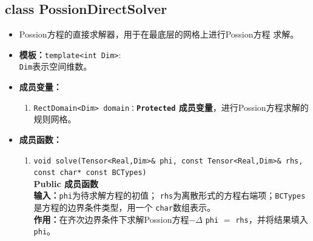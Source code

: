 \documentclass[a4paper,twoside]{ctexart}
\begin{document}
 \subsection*{class PossionDirectSolver}
\begin{itemize}
    \item Possion方程的直接求解器，用于在最底层的网格上进行Possion方程
      求解。
    \item \textbf{模板：}\texttt{template<int Dim>}:\\
    \texttt{Dim}表示空间维数。
     \item \textbf{成员变量：}
        \begin{enumerate}[(1)]
            \item \texttt{RectDomain<Dim>
                domain：}\textbf{\texttt{Protected}  成员变量}，进行Possion方程求解的规则网格。
        \end{enumerate}
    \item \textbf{成员函数：}
        \begin{enumerate}[(1)]
            \item \texttt{void solve(Tensor<Real,Dim>\& phi, const Tensor<Real,Dim>\&
                rhs, const char* const BCTypes)}\\
              \textbf{Public 成员函数}\\
            \textbf{输入：}\texttt{phi}为待求解方程的初值；
            \texttt{rhs}为离散形式的方程右端项；\texttt{BCTypes}是方程的边界条件类型，用一个
            \texttt{char}数组表示。\\
            \textbf{作用：}在齐次边界条件下求解Possion方程$-\Delta$ \texttt{phi} $=$
            \texttt{rhs}，并将结果填入\texttt{phi}。
        \end{enumerate}
\end{itemize}
\end{document}
